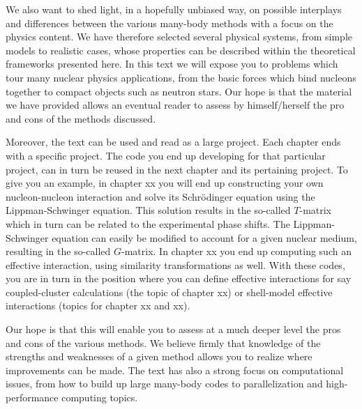 \documentclass[graybox,sectrefs,envcountresetchap,open=right]{svmonodo}
\begin{document}
We also  want  to shed light, in a hopefully unbiased way, on possible interplays and
differences between the various many-body methods with a focus
on the physics content. 
We have therefore selected several physical systems,
from simple models to realistic cases,  whose properties can be
described within the theoretical frameworks presented here.
In this text we will expose you to problems which tour many nuclear physics applications, 
from the basic forces which bind nucleons together to compact objects such as neutron stars.  
Our hope is that the material we have provided   allows an eventual reader to  assess 
by himself/herself the pro and cons of the methods discussed.

Moreover,  the text can be used and read as a large project. Each chapter ends with a specific project. The code you end up developing 
for that particular project, can in turn be  reused in the next chapter and its pertaining project.  To give you an example,
in chapter xx you will end up constructing your own nucleon-nucleon interaction and solve its Schr\"odinger equation using the Lippman-Schwinger
equation.  This solution results in the so-called $T$-matrix  which in turn can be related to the experimental phase shifts.
The Lippman-Schwinger equation can easily be modified to account for a given nuclear medium, resulting in the 
so-called $G$-matrix.  In chapter xx you end up computing such an effective interaction, using similarity transformations as well.
With these codes, you are in turn in the position where you can define effective interactions for say coupled-cluster calculations
(the topic of chapter xx) or shell-model effective interactions (topics for chapter xx and xx).

Our hope is that this will enable  you to assess at a much deeper level the pros and cons of the various methods.  
We believe firmly that knowledge of the strengths and weaknesses of a given method allows you to realize where
improvements can be made.   The text has also a strong focus on computational issues, from how to build up large many-body codes 
to parallelization and high-performance computing topics.
\end{document}
